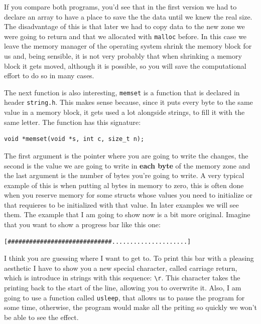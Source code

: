\documentclass[a4paper]{article}
\begin{document}
If you compare both programs, you'd see that in the first version we had to
declare an array to have a place to save the the data until we knew the real
size. The disadvantage of this is that later we had to copy data to the new zone
we were going to return and that we allocated with \verb"malloc" before.
In this case we leave the memory manager of the operating system shrink the
memory block for us and, being sensible, it is not very probably that when
shrinking a memory block it gets moved, although it is possible, so you will
save the computational effort to do so in many cases.

The next function is also interesting, \verb!memset! is a function that is
declared in header \verb!string.h!. This makes sense because, since it puts
every byte to the same value in a memory block, it gets used a lot alongside
strings, to fill it with the same letter. The function has this signature:

\noindent
\begin{minipage}[H]{\linewidth}
\mbox{}
\begin{lstlisting}[style=C,
caption={Signature of function \texttt{memset}},
label={lst:memsetSignature}]
void *memset(void *s, int c, size_t n);
\end{lstlisting}
\end{minipage}

The first argument is the pointer where you are going to write the changes, the
second is the value we are going to write in \textbf{each byte} of the memory
zone and the last argument is the number of bytes you're going to write. A very
typical example of this is when putting al bytes in memory to zero, this is
often done when you reserve memory for some structs whose values you need to
initialize or that requieres to be initialized with that value. In later
examples we will see them. The example that I am going to show now is a bit more
original. Imagine that you want to show a progress bar like this one:
\begin{verbatim}
[#############################.....................]
\end{verbatim}

I think you are guessing where I want to get to. To print this bar with a
pleasing aesthetic I have to show you a new special character, called carriage
return, which is introduce in strings with this sequence: \verb!\r!. This
character takes the printing back to the start of the line, allowing you to
overwrite it. Also, I am going to use a function called \verb!usleep!, that
allows us to pause the program for some time, otherwise, the program would make
all the priting so quickly we won't be able to see the effect.
\end{document}
